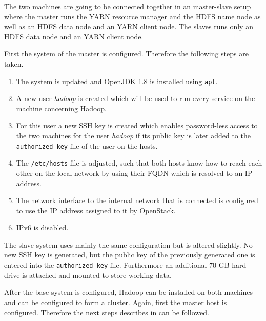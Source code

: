The two machines are going to be connected together in an master-slave setup
where the master runs the \ac{YARN} resource manager and the \ac{HDFS} name node as well as an \ac{HDFS} data node and an \ac{YARN} client node.
The slaves runs only an \ac{HDFS} data node and an \ac{YARN} client node.

First the system of the master is configured. Therefore the following steps are taken.

\begin{enumerate}
    \item The system is updated and OpenJDK 1.8   is installed using \texttt{apt}. 
    \item A new user \emph{hadoop} is created which will be used to run every service on the machine concerning Hadoop.
    \item For this user a new \ac{SSH} key is created which enables password-less access to the two machines for the user \emph{hadoop} if its public key is later added to the \texttt{authorized\_key} file of the user on the hosts.
    \item The \texttt{/etc/hosts} file is adjusted, such that both hosts know how to reach each other on the local network by using their \acs{FQDN} which is resolved to an \ac{IP} address.
    \item The network interface to the internal network that is connected is configured to use the \ac{IP} address assigned to it by OpenStack.
    \item \ac{IP}v6 is disabled.
\end{enumerate}

The slave system uses mainly the same configuration but is altered slightly.
No new \ac{SSH} key is generated, but the public key of the previously
generated one is entered into the \texttt{authorized\_key} file. 
Furthermore an additional 70 \ac{GB} hard drive is attached 
and mounted to store working data.

After the base system is configured, Hadoop can be installed on both machines
and can be configured to form a cluster.
Again, first the master host is configured.
Therefore the next steps describes in 
\autocite[][Appendix A]{white2015hadoop}
can be followed.

